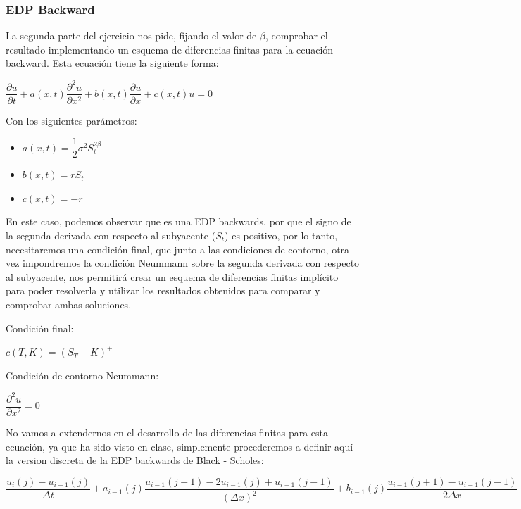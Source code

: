 \documentclass[titlepage]{article}
\begin{document}
\newpage
\subsubsection*{EDP Backward}

La segunda parte del ejercicio nos pide, fijando el valor de $\beta$, comprobar el resultado implementando un esquema de diferencias finitas para la ecuación backward. Esta ecuación tiene la siguiente forma:

\begin{center}
	$\dfrac{\partial u}{\partial t} + a(x, t) \dfrac{\partial^{2}u}{\partial{x}^{2}} + b(x, t) \dfrac{\partial u}{\partial x} + c(x, t) u = 0$
\end{center}

Con los siguientes parámetros:

\begin{itemize}
	\item[] $a(x, t) = \dfrac{1}{2} \sigma^{2} S_{t}^{2\beta}$ 
	\item[] $b(x, t) = rS_{t}$
	\item[] $c(x, t) = -r$	
\end{itemize}

En este caso, podemos observar que es una EDP backwards, por que el signo de la segunda derivada con respecto al subyacente ($S_{t}$) es positivo, por lo tanto, necesitaremos una condición final, que junto a las condiciones de contorno, otra vez impondremos la condición Neummann sobre la segunda derivada con respecto al subyacente, nos permitirá crear un esquema de diferencias finitas implícito para poder resolverla y utilizar los resultados obtenidos para comparar y comprobar ambas soluciones.

\vspace{7pt}
Condición final:
\begin{center}
	$c(T, K) = (S_{T} - K)^{+}$
\end{center}

Condición de contorno Neummann:

\begin{center}
	$\dfrac{\partial^{2}u}{\partial{x}^{2}} = 0$
\end{center}

No vamos a extendernos en el desarrollo de las diferencias finitas para esta ecuación, ya que ha sido visto en clase, simplemente procederemos a definir aquí la version discreta de la EDP backwards de Black - Scholes:

\begin{center}
	$\dfrac{u_{i}(j) - u_{i-1}(j)}{\Delta t} + a_{i-1}(j) \dfrac{u_{i-1}(j+1) - 2u_{i-1}(j) + u_{i-1}(j-1)}{(\Delta x)^2} + b_{i-1}(j) \dfrac{u_{i-1}(j+1) - u_{i-1}(j-1)}{2 \Delta x} + c_{i-1}(j) u_{i-1}(j) = 0$
\end{center}
\end{document}

